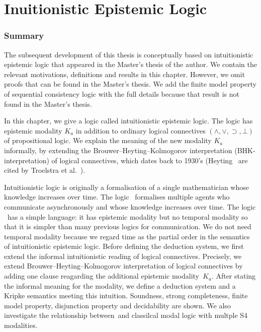 \chapter{Inuitionistic Epistemic Logic}
\label{ch:seqcon}


  \subsection{Summary}

  The subsequent development of this thesis is conceptually based on
  intuitionistic epistemic logic that appeared in the Master's thesis
  of the author.
  We contain the relevant motivations, definitions and results in this chapter.
  However, we omit proofs that
  can be found in the Master's thesis.
  We add the finite model property of sequential consistency logic
  with the full details because that result is not found in the Master's thesis.

  In this chapter, we give a logic called intuitionistic epistemic logic.
  The logic has epistemic modality $K_a$ in addition to ordinary logical connectives
  $(\wedge, \vee, \supset, \bot)$ of propositional logic.
  We explain the meaning of the new modality $K_a$ informally, by extending
  the Brouwer--Heyting--Kolmogorov interpretation (BHK-interpretation) of logical
  connectives, which dates back to 1930's
  (Heyting~\cite{heyting1930formalen, heyting1931intuitionistische}
  are cited by Troelstra et al.~\cite{troelstra1988constructivism}).

  Intuitionistic logic is originally a formalisation of a single mathematician whose
  knowledge
  increases over time.  The logic \iec\, formalises multiple agents who communicate
  asynchronously and whose knowledge increases over time.
  The logic \iec\, has a simple language:
  it has epistemic modality but no temporal modality
  so that it is simpler than many previous logics for communication.
  We do not need temporal modality because
  we regard time as
  the partial order in the semantics of intuitionistic epistemic logic.
  Before defining the deduction system, we first extend the informal intuitionistic
  reading of logical connectives.
  Precisely,
  we extend Brouwer--Heyting--Kolmogorov interpretation of logical connectives
  by adding one clause reagarding the additional epistemic modality~$K_a$.
  After stating the informal meaning for the modality,
  we define a deduction system and a Kripke semantics meeting this intuition.
  Soundness, strong completeness, finite
  model property, disjunction property and decidability are
  shown.
  We also investigate the relationship between \iec\,and classilcal modal logic with multple
  S4 modalities.

